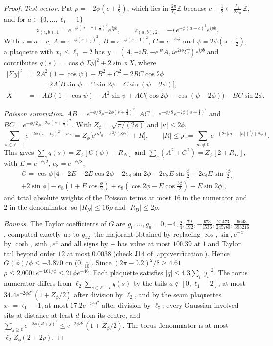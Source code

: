 \documentclass[11pt,a4paper]{amsart}
\theoremstyle{definition}
\theoremstyle{remark}
\numberwithin{equation}{section}
\newcommand{\Z}{\mathbb{Z}}          %
\newcommand{\abs}[1]{\lvert #1\rvert}      %
\begin{document}
\begin{proof}
\emph{Test vector.} Put $p=-2\phi(c+\frac12)$, which lies in $\frac{2\pi}{\ell_2}\Z$ because $c+\frac12\in\frac{\ell_1}{2\kappa_0}\Z$, and for $a\in\{0,\dots,\ell_1-1\}$
\[
z_{(a,b),1}=e^{-\phi(a-c+\frac12)^2}e^{ipb},\qquad z_{(a,b),2}=-i\,e^{-\phi(a-c)^2}e^{ipb}.
\]
With $s=a-c$, $A=e^{-\phi(s+\frac12)^2}$, $B=e^{-\phi(s+1)^2}$, $C=e^{-\phi s^2}$ and $\psi=2\phi(s+\frac12)$, a plaquette with $x_1\le\ell_1-2$ has $y=(A,-iB,-e^{i\psi}A,ie^{2i\phi}C)e^{ipb}$ and contributes $q(s)=\cos\phi\abs{\Sigma y}^2+2\sin\phi\,X$, where
\begin{align*}
\abs{\Sigma y}^2&=2A^2(1-\cos\psi)+B^2+C^2-2BC\cos2\phi\\&\qquad+2A\bigl[B\sin\psi-C\sin2\phi-C\sin(\psi-2\phi)\bigr],\\
X&=-AB(1+\cos\psi)-A^2\sin\psi+AC\bigl(\cos2\phi-\cos(\psi-2\phi)\bigr)-BC\sin2\phi .
\end{align*}

\emph{Poisson summation.} $AB=e^{-\phi/8}e^{-2\phi(s+\frac34)^2}$, $AC=e^{-\phi/8}e^{-2\phi(s+\frac14)^2}$ and $BC=e^{-\phi/2}e^{-2\phi(s+\frac12)^2}$. With $Z_\phi=\sqrt{\pi/(2\phi)}$ and $\abs\kappa\le2\phi$,
\[
\sum_{s\in\Z-c}e^{-2\phi(s-t_0)^2+i\kappa s}=Z_\phi\bigl[e^{i\kappa t_0-\kappa^2/(8\phi)}+R\bigr],\qquad\abs R\le\rho:=\sum_{m\ne0}e^{-(2\pi\abs m-\abs\kappa)^2/(8\phi)}.
\]
This gives $\sum_sq(s)=Z_\phi[G(\phi)+R_N]$ and $\sum_s(A^2+C^2)=Z_\phi[2+R_D]$, with $E=e^{-\phi/2}$, $e_8=e^{-\phi/8}$,
\begin{multline*}
G=\cos\phi\,\bigl[4-2E-2E\cos2\phi-2e_8\sin2\phi-2e_8E\sin\tfrac\phi2+2e_8E\sin\tfrac{3\phi}2\bigr]\\
+2\sin\phi\,\bigl[-e_8(1+E\cos\tfrac\phi2)+e_8(\cos2\phi-E\cos\tfrac{3\phi}2)-E\sin2\phi\bigr],
\end{multline*}
and total absolute weights of the Poisson terms at most $16$ in the numerator and $2$ in the denominator, so $\abs{R_N}\le16\rho$ and $\abs{R_D}\le2\rho$.

\emph{Bounds.} The Taylor coefficients of $G$ are $g_0,\dots,g_6=0,-4,\frac54,\frac{79}{192},-\frac{673}{1536},\frac{21473}{245760},\frac{9643}{393216}$, computed exactly up to $g_{12}$; the majorant obtained by replacing $\cos,\sin,e^{-x}$ by $\cosh,\sinh,e^x$ and all signs by $+$ has value at most $100.39$ at $1$ and Taylor tail beyond order $12$ at most $0.0038$ (check J14 of \cref{app:verification}). Hence $G(\phi)/\phi\le-3.870$ on $(0,\frac1{10}]$. Since $(2\pi-0.2)^2/8\ge4.61$, $\rho\le2.0001e^{-4.61/\phi}\le21\phi e^{-46}$. Each plaquette satisfies $\abs q\le4.3\sum_i\abs{y_i}^2$. The torus numerator differs from $\ell_2\sum_{s\in\Z-c}q(s)$ by the tails $a\notin[0,\ell_1-2]$, at most $34.4e^{-2\phi d^2}(1+Z_\phi/2)$ after division by $\ell_2$, and by the seam plaquettes $x_1=\ell_1-1$, at most $17.2e^{-2\phi d^2}$ after division by $\ell_2$: every Gaussian involved sits at distance at least $d$ from its centre, and $\sum_{j\ge0}e^{-2\phi(d+j)^2}\le e^{-2\phi d^2}(1+Z_\phi/2)$. The torus denominator is at most $\ell_2Z_\phi(2+2\rho)$.


\end{proof}
\end{document}

